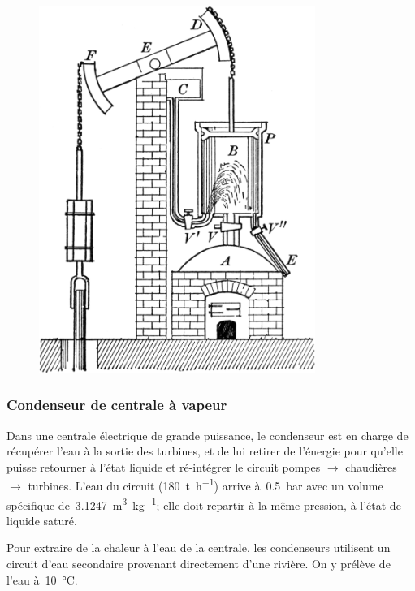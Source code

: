	\begin{figure}[htp] %
		\begin{center}
			\includegraphics[width=9cm]{images/Newcomen6325.png}
		\end{center}
		\label{fig_moteur_newcomen}
	\end{figure}



\subsubsection{Condenseur de centrale à vapeur}

	Dans une centrale électrique de grande puissance, le condenseur est en charge de récupérer l’eau à la sortie des turbines, et de lui retirer de l’énergie pour qu’elle puisse retourner à l’état liquide et ré-intégrer le circuit pompes $\to$ chaudières $\to$ turbines. L’eau du circuit (\SI{180}{\tonne\per\hour}) arrive à~\SI{0,5}{\bar} avec un volume spécifique de~\SI{3,1247}{\metre\cubed\per\kilogram}; elle doit repartir à la même pression, à l’état de liquide saturé.
	
	Pour extraire de la chaleur à l’eau de la centrale, les condenseurs utilisent un circuit d’eau secondaire provenant directement d’une rivière. On y prélève de l’eau à~\SI{10}{\degreeCelsius}.
	
